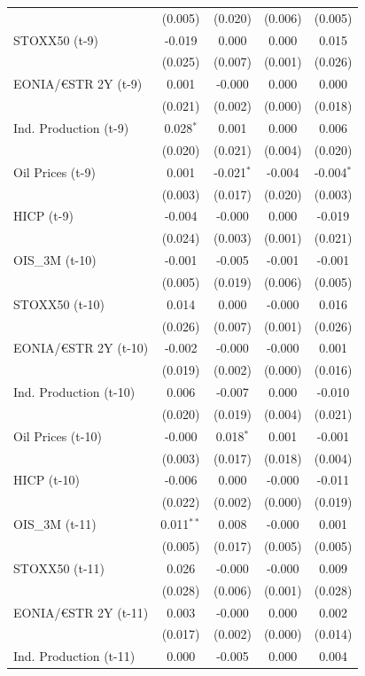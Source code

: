 \begin{longtable}[t]{lcccc}
 & (0.005) & (0.020) & (0.006) & (0.005)\\
STOXX50 (t-9) & -0.019 & 0.000 & 0.000 & 0.015\\
 & (0.025) & (0.007) & (0.001) & (0.026)\\
EONIA/€STR 2Y (t-9) & 0.001 & -0.000 & 0.000 & 0.000\\
 & (0.021) & (0.002) & (0.000) & (0.018)\\
Ind. Production (t-9) & 0.028$^{*}$ & 0.001 & 0.000 & 0.006\\
 & (0.020) & (0.021) & (0.004) & (0.020)\\
Oil Prices (t-9) & 0.001 & -0.021$^{*}$ & -0.004 & -0.004$^{*}$\\
 & (0.003) & (0.017) & (0.020) & (0.003)\\
HICP (t-9) & -0.004 & -0.000 & 0.000 & -0.019\\
 & (0.024) & (0.003) & (0.001) & (0.021)\\
OIS\_3M (t-10) & -0.001 & -0.005 & -0.001 & -0.001\\
 & (0.005) & (0.019) & (0.006) & (0.005)\\
STOXX50 (t-10) & 0.014 & 0.000 & -0.000 & 0.016\\
 & (0.026) & (0.007) & (0.001) & (0.026)\\
EONIA/€STR 2Y (t-10) & -0.002 & -0.000 & -0.000 & 0.001\\
 & (0.019) & (0.002) & (0.000) & (0.016)\\
Ind. Production (t-10) & 0.006 & -0.007 & 0.000 & -0.010\\
 & (0.020) & (0.019) & (0.004) & (0.021)\\
Oil Prices (t-10) & -0.000 & 0.018$^{*}$ & 0.001 & -0.001\\
 & (0.003) & (0.017) & (0.018) & (0.004)\\
HICP (t-10) & -0.006 & 0.000 & -0.000 & -0.011\\
 & (0.022) & (0.002) & (0.000) & (0.019)\\
OIS\_3M (t-11) & 0.011$^{**}$ & 0.008 & -0.000 & 0.001\\
 & (0.005) & (0.017) & (0.005) & (0.005)\\
STOXX50 (t-11) & 0.026 & -0.000 & -0.000 & 0.009\\
 & (0.028) & (0.006) & (0.001) & (0.028)\\
EONIA/€STR 2Y (t-11) & 0.003 & -0.000 & 0.000 & 0.002\\
 & (0.017) & (0.002) & (0.000) & (0.014)\\
Ind. Production (t-11) & 0.000 & -0.005 & 0.000 & 0.004\\

\end{longtable}
